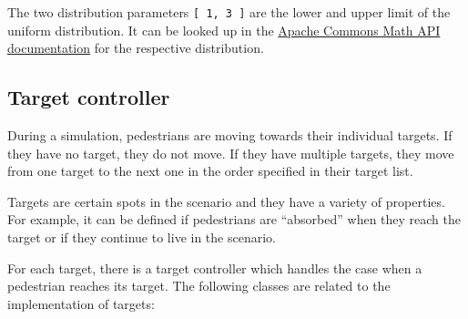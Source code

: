 The two distribution parameters \verb|[ 1, 3 ]| are the lower and upper limit of
the uniform distribution.
It can be looked up in the
\href{https://commons.apache.org/proper/commons-math/apidocs/}%
{Apache Commons Math API documentation} for the respective distribution.

\subsection{Target controller}

During a simulation, pedestrians are moving towards their individual targets.
If they have no target, they do not move.
If they have multiple targets, they move from one target to the next one in the
order specified in their target list.

Targets are certain spots in the scenario and they have a variety of properties.
For example, it can be defined if pedestrians are ``absorbed'' when they reach
the target or if they continue to live in the scenario.

For each target, there is a target controller which handles the case when a
pedestrian reaches its target.
The following classes are related to the implementation of targets:

